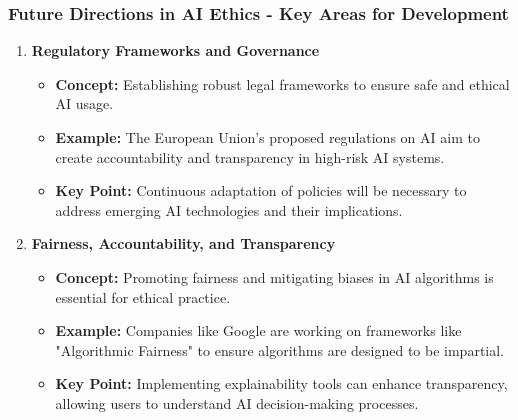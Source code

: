 \documentclass[aspectratio=169]{beamer}
\begin{document}
\begin{frame}[fragile]
    \frametitle{Future Directions in AI Ethics - Key Areas for Development}
    \begin{enumerate}
        \item \textbf{Regulatory Frameworks and Governance}
            \begin{itemize}
                \item \textbf{Concept:} Establishing robust legal frameworks to ensure safe and ethical AI usage.
                \item \textbf{Example:} The European Union's proposed regulations on AI aim to create accountability and transparency in high-risk AI systems.
                \item \textbf{Key Point:} Continuous adaptation of policies will be necessary to address emerging AI technologies and their implications.
            \end{itemize}
        
        \item \textbf{Fairness, Accountability, and Transparency}
            \begin{itemize}
                \item \textbf{Concept:} Promoting fairness and mitigating biases in AI algorithms is essential for ethical practice.
                \item \textbf{Example:} Companies like Google are working on frameworks like "Algorithmic Fairness" to ensure algorithms are designed to be impartial.
                \item \textbf{Key Point:} Implementing explainability tools can enhance transparency, allowing users to understand AI decision-making processes.
            \end{itemize}
    \end{enumerate}
\end{frame}
\end{document}
